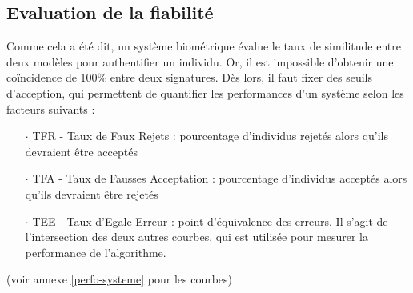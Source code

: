 \subsection{Evaluation de la fiabilité}
Comme cela a été dit, un système biométrique évalue le taux de similitude entre deux modèles pour authentifier un individu. Or, il est impossible d'obtenir une coïncidence de 100\% entre deux signatures. Dès lors, il faut fixer des seuils d'acception, qui permettent de quantifier les performances d'un système selon les facteurs suivants \cite{Xmisc_2}:
\begin{itemize}
\item[$\cdot$]\textsc{TFR} - Taux de Faux Rejets : pourcentage d'individus rejetés alors qu'ils devraient être acceptés
\item[$\cdot$]\textsc{TFA} - Taux de Fausses Acceptation : pourcentage d'individus acceptés alors qu'ils devraient être rejetés
\item[$\cdot$]\textsc{TEE} - Taux d'Egale Erreur : point d'équivalence des erreurs. Il s'agit de l'intersection des deux autres courbes, qui est utilisée pour mesurer la performance de l'algorithme.
\end{itemize}
 (voir annexe \ref{perfo-systeme} pour les courbes)
